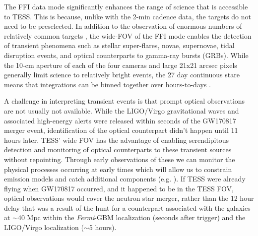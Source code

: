 \documentclass[modern]{aastex61}
\newcommand{\red}[1]{\textcolor{red}{#1}}
\begin{document}
The FFI data mode significantly enhances the range of science that is accessible to TESS. This is because, unlike with the 2-min cadence data, the targets do not need to be preselected. In addition to the observation of enormous numbers of relatively common targets \citep[e.g.][]{Thomas2016,Raddi2017}, the wide-FOV of the FFI mode enables the detection of transient phenomena such as stellar super-flares, novae, supernovae, tidal disruption events, and optical counterparts to gamma-ray bursts (GRBs). While the 10-cm aperture of each of the four cameras and large 21x21 arcsec pixels generally limit science to relatively bright events, the 27 day continuous stare means that integrations can be binned together over hours-to-days \citep[e.g.][]{Pal2015}. 

A challenge in interpreting transient events is that prompt optical observations are not usually not available. While the LIGO/Virgo gravitational waves and associated high-energy alerts were released within seconds of the GW170817 merger event, identification of the optical counterpart didn't happen until 11 hours later. TESS' wide FOV has the advantage of enabling serendipitous detection and monitoring of optical counterparts to these transient sources without repointing.  Through early observations of these we can monitor the physical processes occurring at early times which will allow us to constrain emission models and catch additional components (e.g. \citealt{Racusin2008}).  %
If TESS were already flying when GW170817 occurred, and it happened to be in the TESS FOV, optical observations would cover the neutron star merger, rather than the 12 hour delay that was a result of the hunt for a counterpart associated with the galaxies at $\sim$40 Mpc within the {\it Fermi}-GBM localization (seconds after trigger) and the LIGO/Virgo localization ($\sim$5 hours).
\end{document}
